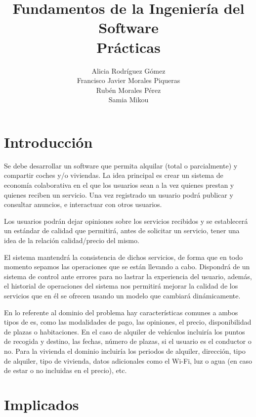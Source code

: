 \documentclass[11pt,spanish]{article} %
\title{Fundamentos de la Ingeniería del Software \\ Prácticas}
\author{Alicia Rodríguez Gómez \\ Francisco Javier Morales Piqueras\\ Rubén Morales Pérez\\ Samia Mikou}
\date{ }
\begin{document}
\maketitle
\tableofcontents %
\newpage
\setlength\parindent{0pt} %


\section{Introducción}
\hspace{0.5cm}Se debe desarrollar un software que permita alquilar (total o parcialmente) y compartir coches y/o viviendas.
La idea principal es crear un sistema de economía colaborativa en el que los usuarios sean a la vez quienes prestan y quienes reciben un servicio.
Una vez registrado un usuario podrá publicar y consultar anuncios, e interactuar con otros usuarios.

\hspace{0.5cm}Los usuarios podrán dejar opiniones sobre los servicios recibidos y se establecerá un estándar de calidad que permitirá, antes de solicitar un servicio, tener una idea de la relación calidad/precio del mismo.

\hspace{0.5cm}El sistema mantendrá la consistencia de dichos servicios, de forma que en todo momento sepamos las operaciones que se están llevando a cabo.
Dispondrá de un sistema de control ante errores para no lastrar la experiencia del usuario, además, el historial de operaciones del sistema nos permitirá mejorar la calidad de los servicios que en él se ofrecen usando un modelo que cambiará dinámicamente.

\hspace{0.5cm}En lo referente al dominio del problema hay características comunes a ambos tipos de es, como las modalidades de pago, las opiniones, el precio, disponibilidad de plazas o habitaciones.
En el caso de alquiler de vehículos incluiría los puntos de recogida y destino, las fechas, número de plazas, si el usuario es el conductor o no.
Para la vivienda el dominio incluiría los periodos de alquiler, dirección, tipo de alquiler, tipo de vivienda, datos adicionales como el Wi-Fi, luz o agua (en caso de estar o no incluidas en el precio), etc.

\section{Implicados}
\end{document}
